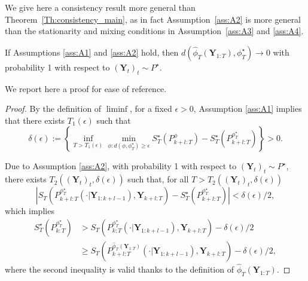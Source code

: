 \documentclass[twoside,11pt]{article}
\newcommand{\Ddobs}{\mathbf{Y}}
\newcommand{\DdobsupT}{\mathbf{Y}_{1:T}}
\newcommand{\Ddobsupkplusl}{\mathbf{Y}_{1:k+l-1}}
\newcommand{\DdobsupTfromk}{\mathbf{Y}_{k+l:T}}
\begin{document}
	We give here a consistency result more general than Theorem~\ref{Th:consistency_main}, as in fact Assumption~\ref{ass:A2} is more general than the stationarity and mixing conditions in Assumption~\ref{ass:A3} and \ref{ass:A4}.
	
	
	\begin{theorem}\label{Th:consistency}
		If Assumptions \ref{ass:A1} and \ref{ass:A2} hold, then $ d(\hat \phi_T(\DdobsupT), \phi^\star_T) \to 0 $ with probability 1  with respect to $(\Ddobs_t)_t\sim P^\star$.
	\end{theorem}
	We report here a proof for ease of reference.
	\begin{proof}
		By the definition of $ \liminf $, for a fixed $ \epsilon>0 $, Assumption \ref{ass:A1} implies that there exists $ T_1(\epsilon) $ such that
		\begin{equation}\label{Eq:proof_inflim}
		\delta(\epsilon) :=\left\{  \inf_{T>T_1(\epsilon)} \min_{\phi: d(\phi, {\phi^\star_T})\ge\epsilon} S_T^\star(P_{k+l:T}^\phi) - S_T^\star(P_{k+l:T}^{\phi^\star_T})    \right\} >0.
		\end{equation}
		
		
		
		
		Due to Assumption \ref{ass:A2}, with probability 1 with respect to $(\Ddobs_t)_t\sim P^\star$, there exists $ T_2((\Ddobs_t)_t, \delta(\epsilon)) $ such that, for all $ T>T_2((\Ddobs_t)_t, \delta(\epsilon))$
		\begin{equation}
		\left| S_T(P^{\phi^\star_T}_{k+l:T}(\cdot|\Ddobsupkplusl), \DdobsupTfromk) - S^\star_T(P^{\phi^\star_T}_{k+l:T})  \right| <\delta(\epsilon)/2,
		\end{equation}
		which implies
		\begin{equation}\label{Eq:proof_ineq1}
		\begin{aligned}
		S^\star_T(P^{\phi^\star_T}_{k:T}) &> S_T(P^{\phi^\star_T}_{k:T}(\cdot|\Ddobsupkplusl), \DdobsupTfromk) -\delta(\epsilon)/2 \\
		&\ge  S_T(P^{\hat \phi_T  (\DdobsupT)}_{k+l:T}(\cdot|\Ddobsupkplusl), \DdobsupTfromk) -\delta(\epsilon)/2,
		\end{aligned}
		\end{equation}
		where the second inequality is valid thanks to the definition of $ \hat \phi_T  (\DdobsupT) $.
		

\end{proof}
\end{document}
